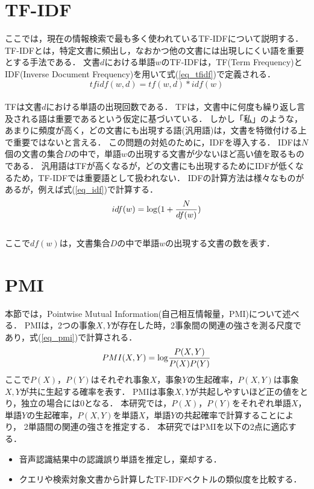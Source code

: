 \section{TF-IDF}
ここでは，現在の情報検索で最も多く使われているTF-IDFについて説明する．
TF-IDFとは，特定文書に頻出し，なおかつ他の文書には出現しにくい語を重要とする手法である．
文書$d$における単語$w$のTF-IDFは，TF(Term Frequency)とIDF(Inverse Document Frequency)を用いて式(\ref{eq_tfidf})で定義される．\\
\begin{equation}
    tfidf(w,d) = tf(w,d) * idf(w)   \label{eq_tfidf}
\end{equation}
\\
TFは文書$d$における単語の出現回数である．
TFは，文書中に何度も繰り返し言及される語は重要であるという仮定に基づいている．
しかし「私」のような，あまりに頻度が高く，どの文書にも出現する語(汎用語)は，文書を特徴付ける上で重要ではないと言える．
この問題の対処のために，IDFを導入する．
IDFは$N$個の文書の集合$D$の中で，単語$w$の出現する文書が少ないほど高い値を取るものである．
汎用語はTFが高くなるが，どの文書にも出現するためにIDFが低くなるため，TF-IDFでは重要語として扱われない．
IDFの計算方法は様々なものがあるが，例えば式(\ref{eq_idf})で計算する．\\
\begin{equation}
    idf(w) = {\rm log} (1 + \frac{N}{df(w)})  \label{eq_idf}
\end{equation}
\\
ここで$df(w)$は，文書集合$D$の中で単語$w$の出現する文書の数を表す．\\

\section{PMI}
本節では，Pointwise Mutual Information(自己相互情報量，PMI)について述べる．
PMIは，2つの事象$X, Y$が存在した時，2事象間の関連の強さを測る尺度であり，式(\ref{eq_pmi})で計算される．
\begin{equation}
    PMI(X, Y) = {\rm log} \frac{P(X, Y)}{P(X)P(Y)}    \label{eq_pmi}
\end{equation}
ここで$P(X)$，$P(Y)$はそれぞれ事象$X$，事象$Y$の生起確率，$P(X, Y)$は事象$X, Y$が共に生起する確率を表す．
PMIは事象$X, Y$が共起しやすいほど正の値をとり，独立の場合には0となる．
本研究では，$P(X)$，$P(Y)$をそれぞれ単語$X$，単語$Y$の生起確率，$P(X, Y)$を単語$X$，単語$Y$の共起確率で計算することにより，
2単語間の関連の強さを推定する．
本研究ではPMIを以下の2点に適応する．
\begin{itemize}
    \item 音声認識結果中の認識誤り単語を推定し，棄却する．
    \item クエリや検索対象文書から計算したTF-IDFベクトルの類似度を比較する．
\end{itemize}

